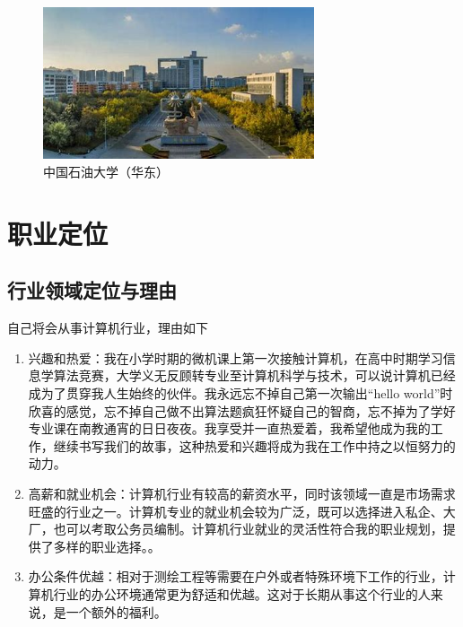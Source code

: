 \documentclass{article}
\begin{document}
\begin{figure}[h!]
	\centering
	\includegraphics[width=8cm]{upcc}
	\caption{中国石油大学（华东）}
	\label{fig:upcc}
\end{figure}

\par 

\section{职业定位}

\subsection{行业领域定位与理由}
自己将会从事计算机行业，理由如下\par
\begin{enumerate}
	\item 兴趣和热爱：我在小学时期的微机课上第一次接触计算机，在高中时期学习信息学算法竞赛，大学义无反顾转专业至计算机科学与技术，可以说计算机已经成为了贯穿我人生始终的伙伴。我永远忘不掉自己第一次输出“hello world”时欣喜的感觉，忘不掉自己做不出算法题疯狂怀疑自己的智商，忘不掉为了学好专业课在南教通宵的日日夜夜。我享受并一直热爱着，我希望他成为我的工作，继续书写我们的故事，这种热爱和兴趣将成为我在工作中持之以恒努力的动力。
	\item 高薪和就业机会：计算机行业有较高的薪资水平，同时该领域一直是市场需求旺盛的行业之一。计算机专业的就业机会较为广泛，既可以选择进入私企、大厂，也可以考取公务员编制。计算机行业就业的灵活性符合我的职业规划，提供了多样的职业选择。。
	\item 办公条件优越：相对于测绘工程等需要在户外或者特殊环境下工作的行业，计算机行业的办公环境通常更为舒适和优越。这对于长期从事这个行业的人来说，是一个额外的福利。
\end{enumerate}
\end{document}
